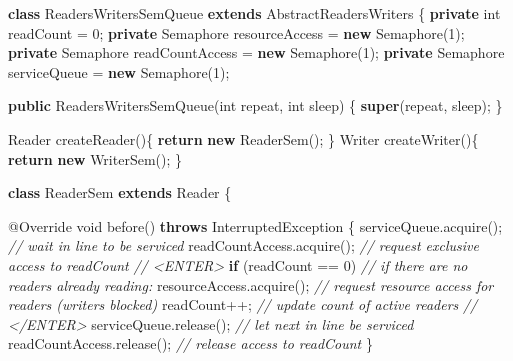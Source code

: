 \documentclass[
]{article}
\newenvironment{Shaded}{\begin{snugshade}}{\end{snugshade}}
\newcommand{\AttributeTok}[1]{\textcolor[rgb]{0.77,0.63,0.00}{#1}}
\newcommand{\BuiltInTok}[1]{#1}
\newcommand{\CommentTok}[1]{\textcolor[rgb]{0.56,0.35,0.01}{\textit{#1}}}
\newcommand{\DataTypeTok}[1]{\textcolor[rgb]{0.13,0.29,0.53}{#1}}
\newcommand{\DecValTok}[1]{\textcolor[rgb]{0.00,0.00,0.81}{#1}}
\newcommand{\FunctionTok}[1]{\textcolor[rgb]{0.00,0.00,0.00}{#1}}
\newcommand{\KeywordTok}[1]{\textcolor[rgb]{0.13,0.29,0.53}{\textbf{#1}}}
\newcommand{\NormalTok}[1]{#1}
\begin{document}
\begin{Shaded}
\begin{Highlighting}[]
\KeywordTok{class}\NormalTok{ ReadersWritersSemQueue }\KeywordTok{extends}\NormalTok{ AbstractReadersWriters}
\NormalTok{\{}
    \KeywordTok{private} \DataTypeTok{int}\NormalTok{ readCount = }\DecValTok{0}\NormalTok{;}
    \KeywordTok{private} \BuiltInTok{Semaphore}\NormalTok{ resourceAccess = }\KeywordTok{new} \BuiltInTok{Semaphore}\NormalTok{(}\DecValTok{1}\NormalTok{);}
    \KeywordTok{private} \BuiltInTok{Semaphore}\NormalTok{ readCountAccess = }\KeywordTok{new} \BuiltInTok{Semaphore}\NormalTok{(}\DecValTok{1}\NormalTok{);}
    \KeywordTok{private} \BuiltInTok{Semaphore}\NormalTok{ serviceQueue = }\KeywordTok{new} \BuiltInTok{Semaphore}\NormalTok{(}\DecValTok{1}\NormalTok{);}

    \KeywordTok{public} \FunctionTok{ReadersWritersSemQueue}\NormalTok{(}\DataTypeTok{int}\NormalTok{ repeat, }\DataTypeTok{int}\NormalTok{ sleep) \{}
        \KeywordTok{super}\NormalTok{(repeat, sleep);}
\NormalTok{    \}}

    \BuiltInTok{Reader} \FunctionTok{createReader}\NormalTok{()\{}
        \KeywordTok{return} \KeywordTok{new} \FunctionTok{ReaderSem}\NormalTok{();}
\NormalTok{    \}}
    \BuiltInTok{Writer} \FunctionTok{createWriter}\NormalTok{()\{}
        \KeywordTok{return} \KeywordTok{new} \FunctionTok{WriterSem}\NormalTok{();}
\NormalTok{    \}}

    \KeywordTok{class}\NormalTok{ ReaderSem }\KeywordTok{extends} \BuiltInTok{Reader}\NormalTok{ \{}

        \AttributeTok{@Override}
        \DataTypeTok{void} \FunctionTok{before}\NormalTok{() }\KeywordTok{throws} \BuiltInTok{InterruptedException}\NormalTok{ \{}
\NormalTok{            serviceQueue.}\FunctionTok{acquire}\NormalTok{();           }\CommentTok{// wait in line to be serviced}
\NormalTok{            readCountAccess.}\FunctionTok{acquire}\NormalTok{();        }\CommentTok{// request exclusive access to readCount}
            \CommentTok{// \textless{}ENTER\textgreater{}}
            \KeywordTok{if}\NormalTok{ (readCount == }\DecValTok{0}\NormalTok{)         }\CommentTok{// if there are no readers already reading:}
\NormalTok{                resourceAccess.}\FunctionTok{acquire}\NormalTok{();     }\CommentTok{// request resource access for readers (writers blocked)}
\NormalTok{            readCount++;                }\CommentTok{// update count of active readers}
            \CommentTok{// \textless{}/ENTER\textgreater{}}
\NormalTok{            serviceQueue.}\FunctionTok{release}\NormalTok{();           }\CommentTok{// let next in line be serviced}
\NormalTok{            readCountAccess.}\FunctionTok{release}\NormalTok{();        }\CommentTok{// release access to readCount}
\NormalTok{        \}}


\end{Highlighting}
\end{Shaded}
\end{document}
